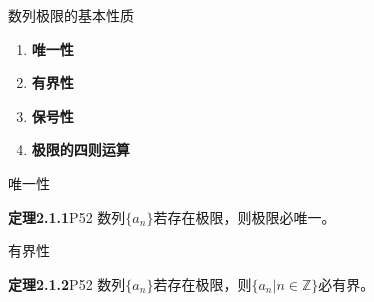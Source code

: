 \begin{frame}{数列极限的基本性质}
	\linespread{1.5}
	\begin{enumerate}\pause 
	  \item {\bf 唯一性}\pause 
	  \item {\bf 有界性}\pause 
	  \item {\bf 保号性}\pause 
	  \item {\bf 极限的四则运算}
	\end{enumerate}
\end{frame}

\begin{frame}{唯一性}
	\linespread{1.2}\pause 
	\begin{block}{{\bf 定理2.1.1}\hfill P52}
		数列$\{a_n\}$若存在极限，则极限必唯一。
	\end{block}\pause 
	\begin{center}
	\end{center}
\end{frame}

\begin{frame}{有界性}
	\linespread{1.2}\pause 
	\begin{block}{{\bf 定理2.1.2}\hfill P52}
		数列$\{a_n\}$若存在极限，则$\{a_n|n\in\mathbb{Z}\}$必有界。
	\end{block}\pause 
	\begin{center}
	\end{center}
\end{frame}


